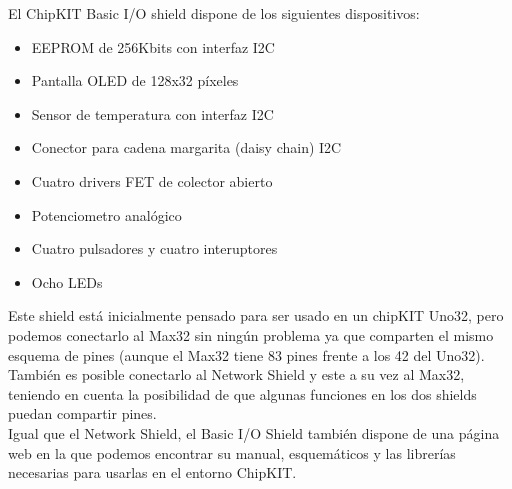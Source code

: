 El ChipKIT Basic I/O shield dispone de los siguientes dispositivos:
\begin{itemize}
	\item EEPROM de 256Kbits con interfaz I2C
	\item Pantalla OLED de 128x32 píxeles
	\item Sensor de temperatura con interfaz I2C
	\item Conector para cadena margarita (daisy chain) I2C
	\item Cuatro drivers FET de colector abierto
	\item Potenciometro analógico
	\item Cuatro pulsadores y cuatro interuptores
	\item Ocho LEDs
\end{itemize}

Este shield está inicialmente pensado para ser usado en un chipKIT Uno32, pero podemos conectarlo al Max32 sin ningún problema ya que comparten el mismo esquema de pines (aunque el Max32 tiene 83 pines frente a los 42 del Uno32). También es posible conectarlo al Network Shield y este a su vez al Max32, teniendo en cuenta la posibilidad de que algunas funciones en los dos shields puedan compartir pines.\\

Igual que el Network Shield, el Basic I/O Shield también dispone de una página web\cite{website:io_shield} en la que podemos encontrar su manual, esquemáticos y las librerías necesarias para usarlas en el entorno ChipKIT.